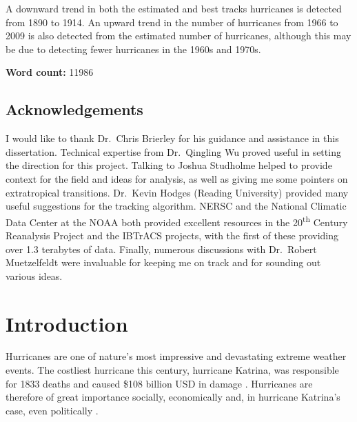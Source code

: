 \documentclass[pdftex,12pt,a4paper]{report}
\newcommand{\ts}{\textsuperscript}
\begin{document}
A downward trend in both the estimated and best tracks hurricanes is detected from 1890 to 1914. An
upward trend in the number of hurricanes from 1966 to 2009 is also detected from the estimated
number of hurricanes, although this may be due to detecting fewer hurricanes in the 1960s and 1970s.

\begin{center}
\textbf{Word count:} 11986 %
\end{center}

\newpage
\section*{Acknowledgements}

I would like to thank Dr.~Chris Brierley for his guidance and assistance in this dissertation.
Technical expertise from Dr.~Qingling Wu proved useful in setting the direction for this project.
Talking to Joshua Studholme helped to provide context for the field and ideas for analysis, as well
as giving me some pointers on extratropical transitions.
Dr.~Kevin Hodges (Reading University) provided many useful suggestions for the tracking algorithm.
NERSC and the National Climatic Data Center at the NOAA both provided excellent resources in the
20\ts{th} Century Reanalysis Project and the IBTrACS projects, with the first of these providing
over 1.3 terabytes of data.
Finally, numerous discussions with Dr.~Robert Muetzelfeldt were invaluable for keeping me on track
and for sounding out various ideas.

\newpage

\tableofcontents

\chapter{Introduction}


Hurricanes are one of nature's most impressive and devastating extreme weather events. The costliest
hurricane this century, hurricane Katrina, was responsible for 1833 deaths and caused \$108
billion USD in damage \parencite{knabb2006tropical}.
Hurricanes are therefore of great importance socially,
economically and, in hurricane Katrina's case, even politically \parencite{kellner2007katrina}.
\end{document}
